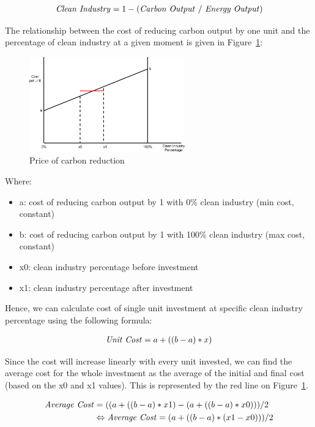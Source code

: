 \begin{align*}
\text{\emph{Clean Industry}} = 1 - (\text{\emph{Carbon Output}}~/~\text{\emph{Energy Output}})
\end{align*}
 
The relationship between the cost of reducing carbon output by one unit and the percentage of 
clean industry at a given moment is given in Figure~\ref{fig:carbon_reduction}:

\begin{figure}[h!]
	\centering
	\includegraphics[width=0.6\textwidth]{img/carbon-reduction.png}
	\caption{Price of carbon reduction}
	\label{fig:carbon_reduction}
\end{figure}

Where:
\begin{itemize}
	\item a: cost of reducing carbon output by 1 with 0\% clean industry (min cost, constant)
	\item b: cost of reducing carbon output by 1 with 100\% clean industry (max cost, constant)
	\item x0: clean industry percentage before investment
	\item x1: clean industry percentage after investment
\end{itemize}

 
Hence, we can calculate cost of single unit investment at specific clean industry percentage using the following formula:

\begin{align*}
\text{\emph{Unit Cost}} = a + ((b - a) * x)
\end{align*}

Since the cost will increase linearly with every unit invested, we can find the average cost for the whole investment as the average of the initial and final cost (based on the x0 and x1 values). This is represented by the red line on Figure~\ref{fig:carbon_reduction}.
 
\begin{align*}
\text{\emph{Average Cost}} &= ((a + ((b - a) * x1) - (a + ((b-a) * x0))) / 2 \\
&\Leftrightarrow \text{\emph{Average  Cost}} = (a + ((b - a) * (x1 - x0))) / 2
\end{align*}

